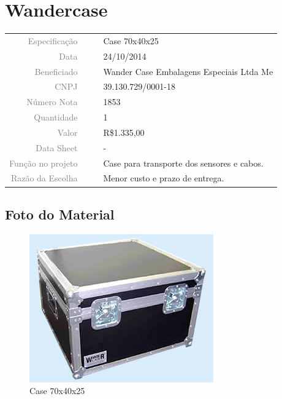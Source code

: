 

\section{Wandercase}
\label{wander}

 
\begin{table}[ht!]

	\begin{tabular}{r l|l p{12cm} }
		
		\textcolor{gray}{Especificação} &&& 	{Case 70x40x25 }\\
		\textcolor{gray}{Data} &&& 				{24/10/2014}\\
        \textcolor{gray}{Beneficiado} &&&		{Wander Case Embalagens Especiais
        Ltda Me}
        \\
        \textcolor{gray}{CNPJ} &&& 				{39.130.729/0001-18} \\
        \textcolor{gray}{Número Nota} &&& 		{1853} \\
		\textcolor{gray}{Quantidade} &&& 		{1} \\
		\textcolor{gray}{Valor} &&& 			{R\$1.335,00} \\
		\textcolor{gray}{Data Sheet} &&& 		{-}
		\\

		\textcolor{gray}{Função no projeto} &&& {Case para transporte dos sensores e
		cabos.}
		\\
		\textcolor{gray}{Razão da Escolha} &&& {Menor custo e prazo de entrega.}
		\end{tabular}
\end{table}

\newpage
\subsection{Foto do Material}
\begin{figure}[H]
 \centering
 \includegraphics[width=1\columnwidth]{Wandercase/foto.jpg}
 \caption{Case 70x40x25}  
\end{figure}

